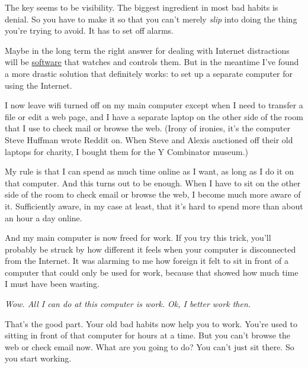 The key seems to be visibility. The biggest ingredient in most bad
habits is denial. So you have to make it so that you can't merely
\emph{slip} into doing the thing you're trying to avoid. It has to set
off alarms.

Maybe in the long term the right answer for dealing with Internet
distractions will be \href{http://rescuetime.com}{software} that watches
and controls them. But in the meantime I've found a more drastic
solution that definitely works: to set up a separate computer for using
the Internet.

I now leave wifi turned off on my main computer except when I need to
transfer a file or edit a web page, and I have a separate laptop on the
other side of the room that I use to check mail or browse the web.
(Irony of ironies, it's the computer Steve Huffman wrote Reddit on. When
Steve and Alexis auctioned off their old laptops for charity, I bought
them for the Y Combinator museum.)

My rule is that I can spend as much time online as I want, as long as I
do it on that computer. And this turns out to be enough. When I have to
sit on the other side of the room to check email or browse the web, I
become much more aware of it. Sufficiently aware, in my case at least,
that it's hard to spend more than about an hour a day online.

And my main computer is now freed for work. If you try this trick,
you'll probably be struck by how different it feels when your computer
is disconnected from the Internet. It was alarming to me how foreign it
felt to sit in front of a computer that could only be used for work,
because that showed how much time I must have been wasting.

\emph{Wow. All I can do at this computer is work. Ok, I better work
then.}

That's the good part. Your old bad habits now help you to work. You're
used to sitting in front of that computer for hours at a time. But you
can't browse the web or check email now. What are you going to do? You
can't just sit there. So you start working.